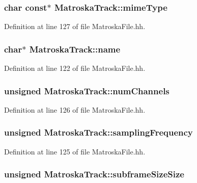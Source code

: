 \subsubsection[{mime\+Type}]{\setlength{\rightskip}{0pt plus 5cm}char const$\ast$ Matroska\+Track\+::mime\+Type}\label{classMatroskaTrack_a87f04f91e54c57316de33f8d13e99d29}


Definition at line 127 of file Matroska\+File.\+hh.

\subsubsection[{name}]{\setlength{\rightskip}{0pt plus 5cm}char$\ast$ Matroska\+Track\+::name}\label{classMatroskaTrack_af239cd3105577d24ee29c447518ce268}


Definition at line 122 of file Matroska\+File.\+hh.

\subsubsection[{num\+Channels}]{\setlength{\rightskip}{0pt plus 5cm}unsigned Matroska\+Track\+::num\+Channels}\label{classMatroskaTrack_a1165af1a2dad3506f44f1c4f3ec743d8}


Definition at line 126 of file Matroska\+File.\+hh.

\subsubsection[{sampling\+Frequency}]{\setlength{\rightskip}{0pt plus 5cm}unsigned Matroska\+Track\+::sampling\+Frequency}\label{classMatroskaTrack_abe30401f61c1b627520eba3d4305c6e1}


Definition at line 125 of file Matroska\+File.\+hh.

\subsubsection[{subframe\+Size\+Size}]{\setlength{\rightskip}{0pt plus 5cm}unsigned Matroska\+Track\+::subframe\+Size\+Size}\label{classMatroskaTrack_a8c100e77ccf3184cece0570e1cf5682c}


